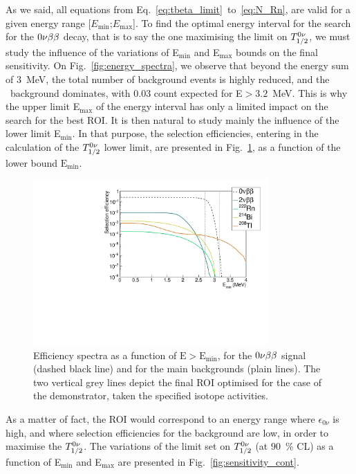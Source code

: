 As we said, all equations from Eq.~\eqref{eq:tbeta_limit}~to~\eqref{eq:N_Rn}, are valid for a given energy range [$E_{\text{min}}$;$E_{\text{max}}$].
To find the optimal energy interval for the search for the $0\nu\beta\beta$ decay, that is to say the one maximising the limit on $T_{1/2}^{0\nu}$, we must study the influence of the variations of E$_{\text{min}}$ and E$_{\text{max}}$ bounds on the final sensitivity.
On Fig.~\ref{fig:energy_spectra}, we observe that beyond the energy sum of $3$~MeV, the total number of background events is highly reduced, and the \Tl\ background dominates, with $0.03$ count expected for E$>3.2$~MeV.
This is why the upper limit E$_{\text{max}}$ of the energy interval has only a limited impact on the search for the best ROI.
It is then natural to study mainly the influence of the lower limit E$_{\text{min}}$.
In that purpose, the selection efficiencies, entering in the calculation of the $T_{1/2}^{0\nu}$ lower limit, are presented in Fig.~\ref{fig:efficiency_spectra}, as a function of the lower bound $\text{E}_{\text{min}}$.
\begin{figure}[h!]
  \centering
  \includegraphics[width=0.8\textwidth]{Sensitivity/fig_sensitivity/efficiency_spectrum_with_B_82Se.pdf}
  \caption{Efficiency spectra as a function of $\text{E}>\text{E}_{\text{min}}$, for the $0\nu\beta\beta$ signal (dashed black line) and for the main backgrounds (plain lines).
    The two vertical grey lines depict the final ROI optimised for the case of the demonstrator, taken the specified isotope activities.
    \label{fig:efficiency_spectra}}
\end{figure}
As a matter of fact, the ROI would correspond to an energy range where $\epsilon_{0\nu}$ is high, and where selection efficiencies for the background are low, in order to maximise the $T_{1/2}^{0\nu}$.
The variations of the limit set on $T_{1/2}^{0\nu}$ (at $90$~\% CL) as a function of E$_{\text{min}}$ and E$_{\text{max}}$ are presented in Fig.~\ref{fig:sensitivity_cont}.
